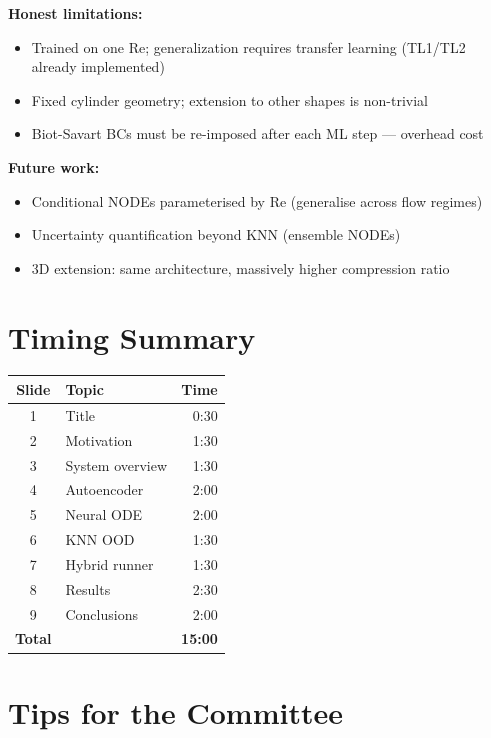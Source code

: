 \documentclass[11pt, a4paper]{article}
\begin{document}
\textbf{Honest limitations:}
\begin{itemize}[noitemsep]
  \item Trained on one Re; generalization requires transfer learning (TL1/TL2 already implemented)
  \item Fixed cylinder geometry; extension to other shapes is non-trivial
  \item Biot-Savart BCs must be re-imposed after each ML step --- overhead cost
\end{itemize}

\textbf{Future work:}
\begin{itemize}[noitemsep]
  \item Conditional NODEs parameterised by Re (generalise across flow regimes)
  \item Uncertainty quantification beyond KNN (ensemble NODEs)
  \item 3D extension: same architecture, massively higher compression ratio
\end{itemize}

\section*{Timing Summary}

\begin{center}
\begin{tabular}{clr}
\toprule
\textbf{Slide} & \textbf{Topic} & \textbf{Time} \\
\midrule
1 & Title & 0:30 \\
2 & Motivation & 1:30 \\
3 & System overview & 1:30 \\
4 & Autoencoder & 2:00 \\
5 & Neural ODE & 2:00 \\
6 & KNN OOD & 1:30 \\
7 & Hybrid runner & 1:30 \\
8 & Results & 2:30 \\
9 & Conclusions & 2:00 \\
\midrule
\textbf{Total} & & \textbf{15:00} \\
\bottomrule
\end{tabular}
\end{center}

\section*{Tips for the Committee}
\end{document}
